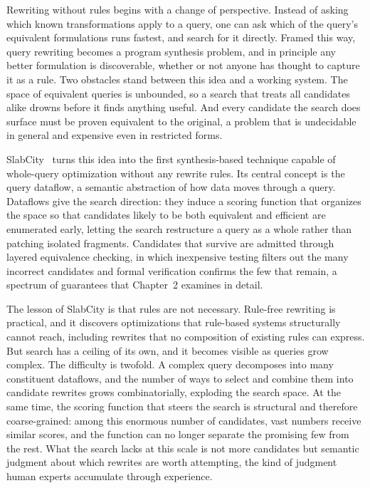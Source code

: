 Rewriting without rules begins with a change of perspective. Instead of
asking which known transformations apply to a query, one can ask which
of the query's equivalent formulations runs fastest, and search for it
directly. Framed this way, query rewriting becomes a program synthesis
problem, and in principle any better formulation is discoverable,
whether or not anyone has thought to capture it as a rule. Two obstacles
stand between this idea and a working system. The space of equivalent
queries is unbounded, so a search that treats all candidates alike
drowns before it finds anything useful. And every candidate the search
does surface must be proven equivalent to the original, a problem that
is undecidable in general and expensive even in restricted forms.

SlabCity~\cite{dong2023slabcity} turns this idea into the first
synthesis-based technique capable of whole-query optimization without
any rewrite rules. Its
central concept is the query dataflow, a semantic abstraction of how
data moves through a query. Dataflows give the search direction: they
induce a scoring function that organizes the space so that candidates
likely to be both equivalent and efficient are enumerated early, letting
the search restructure a query as a whole rather than patching isolated
fragments. Candidates that survive are admitted through layered
equivalence checking, in which inexpensive testing filters out the many
incorrect candidates and formal verification confirms the few that
remain, a spectrum of guarantees that Chapter~2 examines in detail.

The lesson of SlabCity is that rules are not necessary. Rule-free
rewriting is practical, and it discovers optimizations that rule-based
systems structurally cannot reach, including rewrites that no
composition of existing rules can express. But search has a ceiling of
its own, and it becomes visible as queries grow complex. The difficulty
is twofold. A complex query decomposes into many constituent dataflows,
and the number of ways to select and combine them into candidate
rewrites grows combinatorially, exploding the search space. At the same
time, the scoring function that steers the search is structural and
therefore coarse-grained: among this enormous number of candidates,
vast numbers receive similar scores, and the function can no longer
separate the promising few from the rest. What the search lacks at this
scale is not more candidates but semantic judgment about which rewrites
are worth attempting, the kind of judgment human experts accumulate
through experience.


